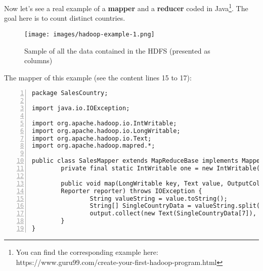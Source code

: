 \documentclass{beamer}[10pt, usepdftitle=false handout]
\begin{document}
\begin{frame}

Now let's see a real example of a \textbf{mapper} and a \textbf{reducer} coded in Java\footnote{You can find the corresponding example here: https://www.guru99.com/create-your-first-hadoop-program.html}. The goal here is to count distinct countries.
\vspace*{0.6em}



	\begin{figure}
	\texttt{[image: images/hadoop-example-1.png]} 
	\caption{Sample of all the data contained in the HDFS (presented as columns)}
	\end{figure}	

\end{frame}
\begin{frame}[fragile]

The mapper of this example (see the content lines 15 to 17):
\vspace*{0.6em}

\begingroup
\fontsize{6pt}{10pt}\selectfont
\begin{Verbatim}[numbers=left,xleftmargin=5mm]
package SalesCountry;

import java.io.IOException;

import org.apache.hadoop.io.IntWritable;
import org.apache.hadoop.io.LongWritable;
import org.apache.hadoop.io.Text;
import org.apache.hadoop.mapred.*;

public class SalesMapper extends MapReduceBase implements Mapper <LongWritable, Text, Text, IntWritable> {
        private final static IntWritable one = new IntWritable(1);

        public void map(LongWritable key, Text value, OutputCollector <Text, IntWritable> output, 
        Reporter reporter) throws IOException {
                String valueString = value.toString();
                String[] SingleCountryData = valueString.split(",");
                output.collect(new Text(SingleCountryData[7]), one);
        }
}
\end{Verbatim}
\endgroup
\end{frame}
\end{document}
